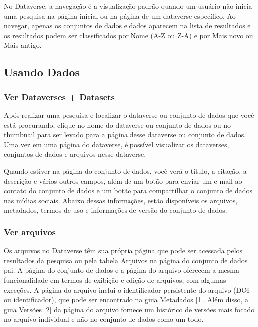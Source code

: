\documentclass[12pt,hidelinks]{article}
\begin{document}
\qquad No Dataverse, a navegação é a visualização padrão quando um usuário não inicia uma pesquisa na página inicial ou na página de um dataverse específico. Ao navegar, apenas os conjuntos de dados e dados aparecem na lista de resultados e os resultados podem ser classificados por Nome (A-Z ou Z-A) e por Mais novo ou Mais antigo.
	    
	\subsection{Usando Dados}
	
	    \subsubsection{Ver Dataverses + Datasets}
	    
\qquad Após realizar uma pesquisa e localizar o dataverse ou conjunto de dados que você está procurando, clique no nome do dataverse ou conjunto de dados ou no thumbnail para ser levado para a página desse dataverse ou conjunto de dados. Uma vez em uma página do dataverse, é possível visualizar os dataverses, conjuntos de dados e arquivos nesse dataverse.

Quando estiver na página do conjunto de dados, você verá o título, a citação, a descrição e vários outros campos, além de um botão para enviar um e-mail ao contato do conjunto de dados e um botão para compartilhar o conjunto de dados nas mídias sociais. Abaixo dessas informações, estão disponíveis os arquivos, metadados, termos de uso e informações de versão do conjunto de dados.
	    
	    \subsubsection{Ver arquivos}
	    
\qquad Os arquivos no Dataverse têm sua própria página que pode ser acessada pelos resultados da pesquisa ou pela tabela Arquivos na página do conjunto de dados pai. A página do conjunto de dados e a página do arquivo oferecem a mesma funcionalidade em termos de exibição e edição de arquivos, com algumas exceções. A página do arquivo inclui o identificador persistente do arquivo (DOI ou identificador), que pode ser encontrado na guia Metadados [1]. Além disso, a guia Versões [2] da página do arquivo fornece um histórico de versões mais focado no arquivo individual e não no conjunto de dados como um todo.
	    
\end{document}
